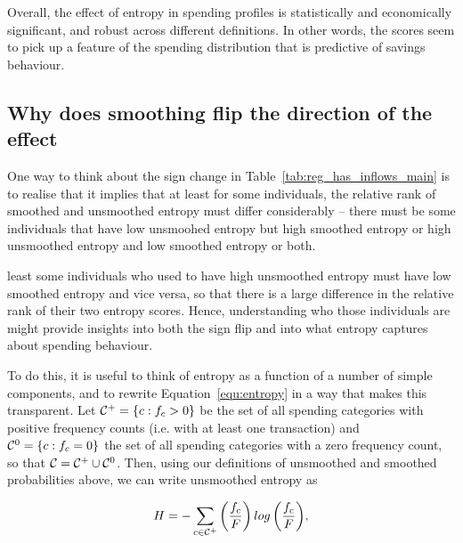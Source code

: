 Overall, the effect of entropy in spending profiles is statistically and
economically significant, and robust across different definitions. In other
words, the scores seem to pick up a feature of the spending distribution that
is predictive of savings behaviour.



\subsection{Why does smoothing flip the direction of the effect}%
\label{sub:why_does_smoothing_flip_the_direction_of_the_effect}

One way to think about the sign change in Table~\ref{tab:reg_has_inflows_main}
is to realise that it implies that at least for some individuals, the relative
rank of smoothed and unsmoothed entropy must differ considerably -- there must
be some individuals that have low unsmoohed entropy but high smoothed entropy
or high unsmoothed entropy and low smoothed entropy or both.


least some individuals who used to have
high unsmoothed entropy must have low smoothed entropy and vice versa, so that
there is a large difference in the relative rank of their two entropy scores.
Hence, understanding who those individuals are might provide insights into both
the sign flip and into what entropy captures about spending behaviour.

To do this, it is useful to think of entropy as a function of a number of
simple components, and to rewrite Equation~\ref{equ:entropy} in a way that
makes this transparent. Let $\mathcal{C}^{+} = \{c: f_c > 0\}$ be the set of all
spending categories with positive frequency counts (i.e.  with at least one
transaction) and $\mathcal{C}^{0} = \{c: f_c = 0\}$ the set of all spending categories
with a zero frequency count, so that $\mathcal{C} = \mathcal{C}^{+} \cup \mathcal{C}^{0}$. Then, using
our definitions of unsmoothed and smoothed probabilities above, we can write
unsmoothed entropy as

\begin{equation}
\label{equ:entropy_us}
H = -\sum_{c \in \mathcal{C}^{+}}{\left(\frac{f_c}{F}\right)
log\left(\frac{f_c}{F}\right)},
\end{equation}

